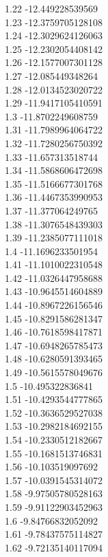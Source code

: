 {1.22	-12.449228539569\\
1.23	-12.3759705128108\\
1.24	-12.3029624126063\\
1.25	-12.2302054408142\\
1.26	-12.1577007301128\\
1.27	-12.085449348264\\
1.28	-12.0134523020722\\
1.29	-11.9417105410591\\
1.3	-11.8702249608759\\
1.31	-11.7989964064722\\
1.32	-11.7280256750392\\
1.33	-11.657313518744\\
1.34	-11.5868606472698\\
1.35	-11.5166677301768\\
1.36	-11.4467353990953\\
1.37	-11.377064249765\\
1.38	-11.3076548439303\\
1.39	-11.2385077111018\\
1.4	-11.1696233501954\\
1.41	-11.1010022310548\\
1.42	-11.0326447958688\\
1.43	-10.9645514604889\\
1.44	-10.8967226156546\\
1.45	-10.8291586281347\\
1.46	-10.7618598417871\\
1.47	-10.6948265785473\\
1.48	-10.6280591393465\\
1.49	-10.5615578049676\\
1.5	-10.495322836841\\
1.51	-10.4293544777865\\
1.52	-10.3636529527038\\
1.53	-10.2982184692155\\
1.54	-10.2330512182667\\
1.55	-10.1681513746831\\
1.56	-10.103519097692\\
1.57	-10.0391545314072\\
1.58	-9.97505780528163\\
1.59	-9.91122903452963\\
1.6	-9.84766832052092\\
1.61	-9.78437575114827\\
1.62	-9.72135140117094\\
}
